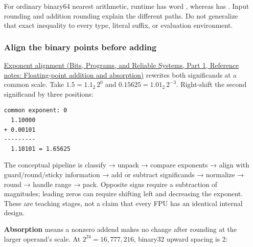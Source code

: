 For ordinary binary64 nearest arithmetic, runtime  has word , whereas  has . Input rounding and addition rounding explain the different paths. Do not generalize that exact inequality to every type, literal suffix, or evaluation environment.

\subsubsection{Align the binary points before adding}\label{05-engine-i-ch001-align-the-binary-points-before-adding}

\hypertarget{05-engine-i-ch001-align-the-binary-points-before-adding}{}

\href{../01-Bits-Programs-and-Reliable-Systems-P01/main.pdf\#appendix-a1b1b4580dfd}{Exponent alignment (Bits, Programs, and Reliable Systems, Part 1, Reference notes: Floating-point addition and absorption)} rewrites both significands at a common scale. Take \(1.5=1.1_2\,2^0\) and \(0.15625=1.01_2\,2^{-3}\). Right-shift the second significand by three positions:

\begin{verbatim}
common exponent: 0
  1.10000
+ 0.00101
---------
  1.10101 = 1.65625
\end{verbatim}

The conceptual pipeline is classify → unpack → compare exponents → align with guard/round/sticky information → add or subtract significands → normalize → round → handle range → pack. Opposite signs require a subtraction of magnitudes; leading zeros can require shifting left and decreasing the exponent. These are teaching stages, not a claim that every FPU has an identical internal design.

\textbf{Absorption} means a nonzero addend makes no change after rounding at the larger operand's scale. At \(2^{24}=16{,}777{,}216\), binary32 upward spacing is 2:

